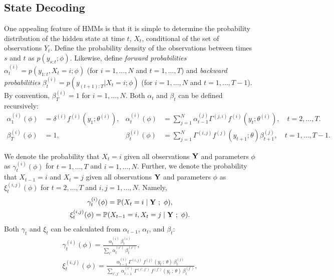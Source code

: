 \subsection{State Decoding}

One appealing feature of HMMs is that it is simple to determine the probability distribution of the hidden state at time $t$, $X_t$, conditional of the set of observations $Y_t$. Define the probability density of the observations between times $s$ and $t$ as $p(y_{s:t};\phi)$. Likewise, define \textit{forward probabilities} $\alpha^{(i)}_t = p(y_{1:t},X_t = i;\phi)$ (for $i = 1,\ldots,N$ and $t = 1,\ldots,T$) and \textit{backward probabilities} $\beta^{(i)}_t = p(y_{(t+1):T}|X_t = i;\phi)$ (for $i = 1,\ldots,N$ and $t = 1,\ldots,T-1$). By convention, $\beta^{(i)}_T = 1$ for $i = 1,\ldots,N$. 
Both $\alpha_t$ and $\beta_t$ can be defined recursively:
%
\begin{align}
    \alpha_1^{(i)}(\phi) &= \delta^{(i)} f^{(i)}(y_1;\theta^{(i)}), & \alpha_t^{(i)}(\phi) &= \sum_{j=1}^N \alpha_{t-1}^{(j)} \Gamma^{(j,i)} f^{(i)}(y_t;\theta^{(i)}), \quad t = 2,\ldots,T. \label{eqn:alpha} \\
    \beta_T^{(i)}(\phi) &= 1, & \beta_t^{(i)}(\phi) &= \sum_{j=1}^N \Gamma^{(i,j)} f^{(j)}(y_{t+1};\theta) \beta^{(j)}_{t+1}, \quad t = 1,\ldots,T-1. \label{eqn:beta}
\end{align}

We denote the probability that $X_t = i$ given all observations $\mathbf{Y}$ and parameters $\phi$ as $\gamma_t^{(i)}(\phi)$ for $t = 1,\ldots,T$ and $i = 1,\ldots,N$. Further, we denote the probability that $X_{t-1} = i$ and $X_t = j$ given all observations $\mathbf{Y}$ and parameters $\phi$ as $\xi_t^{(i,j)}(\phi)$ for $t = 2,\ldots,T$ and $i,j = 1,\ldots,N$. Namely,
%
\begin{gather}
    \gamma_t^{(i)}(\phi) = \mathbb{P}(X_t = i \mid \mathbf{Y} ~;~ \phi), \\ \xi_t^{(i,j)}(\phi) = \mathbb{P}(X_{t-1} = i, X_t = j \mid \mathbf{Y} ~;~ \phi). \nonumber
\end{gather}
%
Both $\gamma_t$ and $\xi_t$ can be calculated from $\alpha_{t-1}$, $\alpha_t$, and $\beta_t$:
%
\begin{gather}
    \gamma_{t}^{(i)}(\phi) = \frac{\alpha_{t}^{(i)} ~ \beta_{t}^{(i)}}{\sum_{i'} \alpha_{t}^{(i')} ~ \beta_{t}^{(i')}}, \label{eqn:gamma} \\
    \xi_{t}^{(i,j)}(\phi) = \frac{\alpha_{t-1}^{(i)} ~ \Gamma^{(i,j)} ~ f^{(j)}(y_{t} ~ ; ~\theta) ~ \beta_{t}^{(j)}}{\sum_{i',j'} ~ \alpha_{t-1}^{(i')} ~ \Gamma^{(i',j')} ~ f^{(j')}(y_{t} ~ ; ~\theta) ~ \beta_{t}^{(j')}} \label{eqn:xi},
\end{gather}

